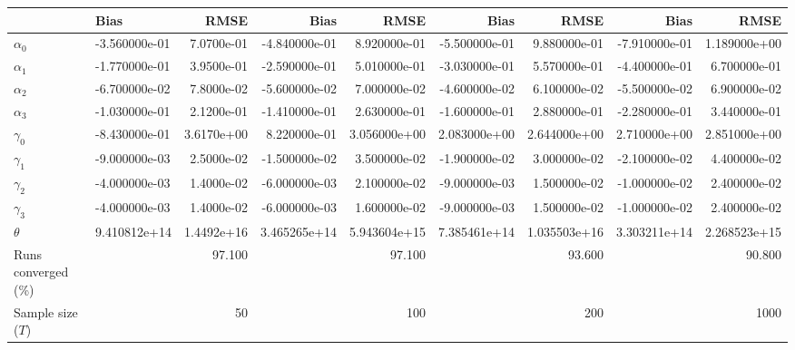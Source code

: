 
\begin{tabular}[t]{llrrrrrrr}
\toprule
  & Bias & RMSE & Bias & RMSE & Bias & RMSE & Bias & RMSE\\
\midrule
$\alpha_{0}$ & -3.560000e-01 & 7.0700e-01 & -4.840000e-01 & 8.920000e-01 & -5.500000e-01 & 9.880000e-01 & -7.910000e-01 & 1.189000e+00\\
$\alpha_{1}$ & -1.770000e-01 & 3.9500e-01 & -2.590000e-01 & 5.010000e-01 & -3.030000e-01 & 5.570000e-01 & -4.400000e-01 & 6.700000e-01\\
$\alpha_{2}$ & -6.700000e-02 & 7.8000e-02 & -5.600000e-02 & 7.000000e-02 & -4.600000e-02 & 6.100000e-02 & -5.500000e-02 & 6.900000e-02\\
$\alpha_{3}$ & -1.030000e-01 & 2.1200e-01 & -1.410000e-01 & 2.630000e-01 & -1.600000e-01 & 2.880000e-01 & -2.280000e-01 & 3.440000e-01\\
$\gamma_{0}$ & -8.430000e-01 & 3.6170e+00 & 8.220000e-01 & 3.056000e+00 & 2.083000e+00 & 2.644000e+00 & 2.710000e+00 & 2.851000e+00\\
$\gamma_{1}$ & -9.000000e-03 & 2.5000e-02 & -1.500000e-02 & 3.500000e-02 & -1.900000e-02 & 3.000000e-02 & -2.100000e-02 & 4.400000e-02\\
$\gamma_{2}$ & -4.000000e-03 & 1.4000e-02 & -6.000000e-03 & 2.100000e-02 & -9.000000e-03 & 1.500000e-02 & -1.000000e-02 & 2.400000e-02\\
$\gamma_{3}$ & -4.000000e-03 & 1.4000e-02 & -6.000000e-03 & 1.600000e-02 & -9.000000e-03 & 1.500000e-02 & -1.000000e-02 & 2.400000e-02\\
$\theta$ & 9.410812e+14 & 1.4492e+16 & 3.465265e+14 & 5.943604e+15 & 7.385461e+14 & 1.035503e+16 & 3.303211e+14 & 2.268523e+15\\
Runs converged (\%) &  & 97.100 &  & 97.100 &  & 93.600 &  & 90.800\\
Sample size ($T$) &  & 50 &  & 100 &  & 200 &  & 1000\\
\bottomrule
\end{tabular}
